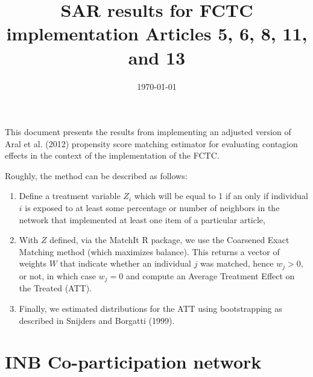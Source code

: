 \documentclass[10pt]{article}
\title{SAR results for FCTC implementation Articles 5, 6, 8, 11, and 13}
\date{\today}
\begin{document}
\maketitle
\tableofcontents

This document presents the results from implementing an adjusted version of Aral et al. (2012)
propensity score matching estimator for evaluating contagion effects in the context of
the implementation of the FCTC.

Roughly, the method can be described as follows:

\begin{enumerate}
\item Define a treatment variable $Z_i$ which will be equal to 1 if an only
if individual $i$ is exposed to at least some percentage or number of neighbors
in the network that implemented at least one item of a particular article,
\item With $Z$ defined, via the MatchIt R package, we use the Coarsened
Exact Matching method (which maximizes balance). This returns a vector of weights $W$ that indicate whether
an individual $j$ was matched, hence $w_j>0$, or not, in which case $w_j=0$ and
compute an Average Treatment Effect on the Treated (ATT).
\item Finally, we estimated distributions for the ATT using bootstrapping
as described in Snijders and Borgatti (1999).
\end{enumerate}

\section{INB Co-participation network}
\end{document}
